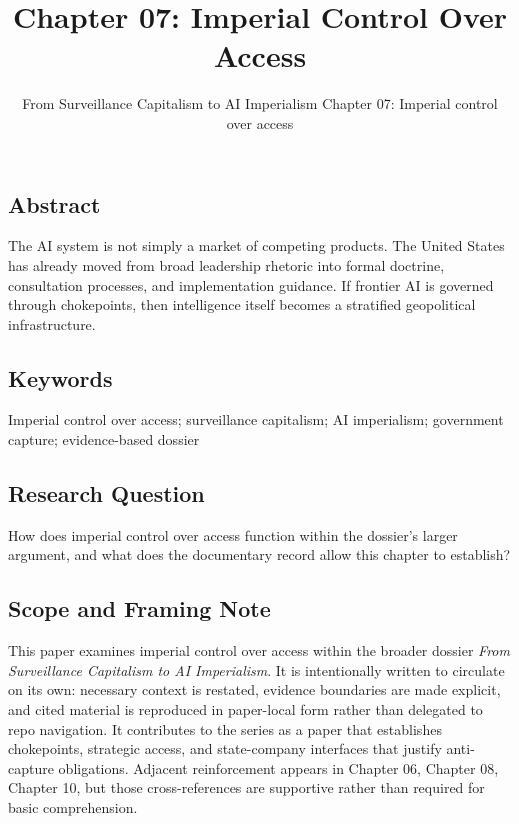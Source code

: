 \documentclass[
  american,
  11pt,
  letterpaper,
]{article}
\title{Chapter 07: Imperial Control Over Access}
\subtitle{From Surveillance Capitalism to AI Imperialism \textbar{}
Chapter 07: Imperial control over access}
\author{}
\date{}
\begin{document}
\maketitle

\subsection{Abstract}\label{abstract}

The AI system is not simply a market of competing products. The United
States has already moved from broad leadership rhetoric into formal
doctrine, consultation processes, and implementation guidance. If
frontier AI is governed through chokepoints, then intelligence itself
becomes a stratified geopolitical infrastructure.

\subsection{Keywords}\label{keywords}

Imperial control over access; surveillance capitalism; AI imperialism;
government capture; evidence-based dossier

\subsection{Research Question}\label{research-question}

How does imperial control over access function within the dossier's
larger argument, and what does the documentary record allow this chapter
to establish?

\subsection{Scope and Framing Note}\label{scope-and-framing-note}

This paper examines imperial control over access within the broader
dossier \emph{From Surveillance Capitalism to AI Imperialism}. It is
intentionally written to circulate on its own: necessary context is
restated, evidence boundaries are made explicit, and cited material is
reproduced in paper-local form rather than delegated to repo navigation.
It contributes to the series as a paper that establishes chokepoints,
strategic access, and state-company interfaces that justify anti-capture
obligations. Adjacent reinforcement appears in Chapter 06, Chapter 08,
Chapter 10, but those cross-references are supportive rather than
required for basic comprehension.
\end{document}
